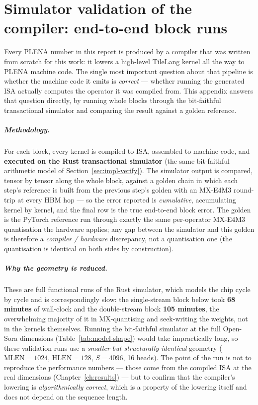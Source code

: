 \documentclass[11pt]{report}
\begin{document}
\appendix

\chapter{Simulator validation of the compiler: end-to-end block runs}
\label{app:sim-validation}

Every PLENA number in this report is produced by a compiler that was written
from scratch for this work: it lowers a high-level TileLang kernel all the way
to PLENA machine code. The single most important question about that pipeline
is whether the machine code it emits is \emph{correct} --- whether running the
generated ISA actually computes the operator it was compiled from. This
appendix answers that question directly, by running whole blocks through the
bit-faithful transactional simulator and comparing the result against a golden
reference.

\paragraph{Methodology.} For each block, every kernel is compiled to ISA,
assembled to machine code, and \textbf{executed on the Rust transactional
simulator} (the same bit-faithful arithmetic model of
Section~\ref{sec:impl-verify}). The simulator output is compared, tensor by
tensor along the whole block, against a golden chain in which each step's
reference is built from the previous step's golden with an MX-E4M3 round-trip
at every HBM hop --- so the error reported is \emph{cumulative}, accumulating
kernel by kernel, and the final row is the true end-to-end block error. The
golden is the PyTorch reference run through exactly the same per-operator
MX-E4M3 quantisation the hardware applies; any gap between the simulator and
this golden is therefore a \emph{compiler / hardware} discrepancy, not a
quantisation one (the quantisation is identical on both sides by
construction).

\paragraph{Why the geometry is reduced.} These are full functional runs of the
Rust simulator, which models the chip cycle by cycle and is correspondingly
slow: the single-stream block below took \textbf{68 minutes} of wall-clock and
the double-stream block \textbf{105 minutes}, the overwhelming majority of it
in MX-quantising and seek-writing the weights, not in the kernels themselves.
Running the bit-faithful simulator at the full Open-Sora dimensions
(Table~\ref{tab:model-shape}) would take impractically long, so these
validation runs use a \emph{smaller but structurally identical} geometry
($\text{MLEN}=1024$, $\text{HLEN}=128$, $S=4096$, 16 heads). The point of the
run is not to reproduce the performance numbers --- those come from the
compiled ISA at the real dimensions (Chapter~\ref{ch:results}) --- but to
confirm that the compiler's lowering is \emph{algorithmically correct}, which
is a property of the lowering itself and does not depend on the sequence
length.
\end{document}

